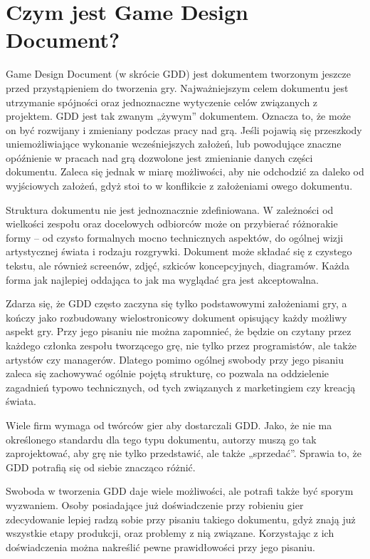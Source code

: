 \documentclass[12pt]{xmgr}
\begin{document}
\chapter{Czym jest Game Design Document?}

Game Design Document (w skrócie GDD) jest dokumentem tworzonym jeszcze przed przystąpieniem do tworzenia gry. Najważniejszym celem dokumentu jest utrzymanie spójności oraz jednoznaczne wytyczenie celów związanych z projektem. GDD jest tak zwanym „żywym” dokumentem. Oznacza to, że może on być rozwijany i zmieniany podczas pracy nad grą. Jeśli pojawią się przeszkody uniemożliwiające wykonanie wcześniejszych założeń, lub powodujące znaczne opóźnienie w pracach nad grą dozwolone jest zmienianie danych części dokumentu. Zaleca się jednak w miarę możliwości, aby nie odchodzić za daleko od wyjściowych założeń, gdyż stoi to w konflikcie z założeniami owego dokumentu.

Struktura dokumentu nie jest jednoznacznie zdefiniowana. W zależności od wielkości zespołu oraz docelowych odbiorców może on przybierać różnorakie formy – od czysto formalnych mocno technicznych aspektów, do ogólnej wizji artystycznej świata i rodzaju rozgrywki. Dokument może składać się z czystego tekstu, ale również screenów, zdjęć, szkiców koncepcyjnych, diagramów. Każda forma jak najlepiej oddająca to jak ma wyglądać gra jest akceptowalna.

Zdarza się, że GDD często zaczyna się tylko podstawowymi założeniami gry, a kończy jako rozbudowany wielostronicowy dokument opisujący każdy możliwy aspekt gry. Przy jego pisaniu nie można zapomnieć, że   będzie on czytany przez każdego członka zespołu tworzącego grę, nie tylko przez programistów, ale także artystów czy managerów. Dlatego pomimo ogólnej swobody przy jego pisaniu zaleca się zachowywać ogólnie pojętą strukturę, co pozwala na oddzielenie zagadnień typowo technicznych, od tych związanych z marketingiem czy kreacją świata.

Wiele firm wymaga od twórców gier aby dostarczali GDD. Jako, że nie ma określonego standardu dla tego typu dokumentu, autorzy muszą go tak zaprojektować, aby grę nie tylko przedstawić, ale także „sprzedać”. Sprawia to, że GDD potrafią się od siebie znacząco różnić.

Swoboda w tworzenia GDD daje wiele możliwości, ale potrafi także być sporym wyzwaniem. Osoby posiadające już doświadczenie przy robieniu gier zdecydowanie lepiej radzą sobie przy pisaniu takiego dokumentu, gdyż znają już wszystkie etapy produkcji, oraz problemy z nią związane. Korzystając z ich doświadczenia można nakreślić pewne prawidłowości przy jego pisaniu.
\end{document}
